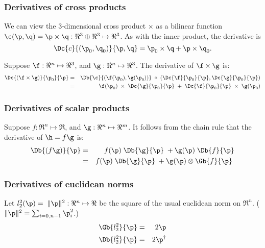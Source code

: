 \subsubsection{Derivatives of cross products}
\label{sec:cross}

We can view the 3-dimensional cross product
$ \times $
as a bilinear function
$\c(\p,\q) = \p \times \q : \Re^3 \oplus \Re^3 \mapsto \Re^3$.
As with the inner product,
the derivative is
\begin{equation}
\Dc{c}{(\p_0,\q_0)}{\p,\q} = \p_0 \times \q + \p \times \q_0.
\end{equation}

Suppose
$\f:\Re^{n} \mapsto \Re^3$, and
$\g:\Re^{n} \mapsto \Re^3$.
The derivative of $\f \times \g$ is:
\begin{eqnarray}
\Dc{(\f \times \g)}{\p_0}{\p}
& =
& \Db{\c}{(\f(\p_0),\g(\p_0))} \;\circ \;(\Dc{\f}{\p_0}{\p}, \Dc{\g}{\p_0}{\p})
\\
& =
& \f(\p_0) \;\times \;\Dc{\g}{\p_0}{\p} \;+ \;\Dc{\f}{\p_0}{\p} \;\times \;\g(\p_0) \nonumber
\end{eqnarray}


\subsubsection{Derivatives of scalar products}
\label{sec:scalar}

Suppose
$f:\Re^{n} \mapsto \Re$, and
$\g:\Re^{n} \mapsto \Re^m$.
It follows from the chain rule that the derivative of $\h = f\g$ is:
\begin{eqnarray}
\label{eq:scalar_product_derivative}
\Db{(f\g)}{\p}
& = & f(\p) \;\Db{\g}{\p} \;+ \g(\p) \; \Db{f}{\p}  \\
& = & f(\p) \;\Db{\g}{\p} \;+ \g(\p) \otimes \Gb{f}{\p} \; \nonumber
\end{eqnarray}



\subsubsection{Derivatives of euclidean norms}
\label{sec:norms}

Let $l_2^2(\p) = \; \| \p  \|^2 : \Re^n \mapsto \Re$
be the square of the usual euclidean norm on $\Re^n$.
($ \| \p  \|^2  = \sum_{i=0,n-1} \p_i^2$.)
\begin{eqnarray}
\label{eq:l2-gradient}
\Gb{l_2^2}{\p} & = & 2\p \\
\Db{l_2^2}{\p} & = & 2\p^\dagger
\end{eqnarray}

